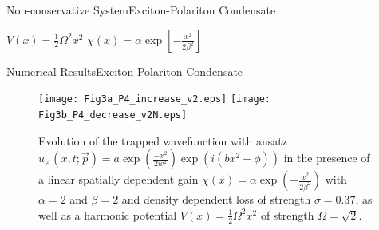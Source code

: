 \begin{frame}[c]{Non-conservative System}{Exciton-Polariton Condensate}


	\begin{center}	\textcolor{Comment}{$  V(x) = \frac{1}{2} \Omega^2 x^2 $ } \quad \quad  \quad 
	\textcolor{crimsonred}{$ \chi(x) =  \alpha \exp \left[ -\frac{x^2}{2\beta^2} \right] $}
	\end{center}

	
\end{frame}
%




\begin{frame}[c]{Numerical Results}{Exciton-Polariton Condensate}
\begin{figure}[H!]
\centering
\texttt{[image: Fig3a\_P4\_increase\_v2.eps]}
\texttt{[image: Fig3b\_P4\_decrease\_v2N.eps]}
\caption{\tiny{
Evolution of the trapped wavefunction with ansatz \textcolor{regal}{$u_A(x,t; \vec{p}) = a \exp \left( \frac{-x^2}{2 w^2}\right)  \exp \left( i \left(bx^2 + \phi\right)\right) $}
in the presence of a linear spatially
dependent gain $\chi(x) = \alpha \exp\left(  -\frac{x^2}{2\beta^2} \right)$ with
$\alpha =2$ and $\beta=2$ and density dependent loss of strength 
$\sigma =0.37$, as well as a harmonic potential $V(x) = \frac{1}{2}\Omega^2 x^2$
of strength $\Omega = \sqrt{2}$.}}
\end{figure}
\end{frame}

